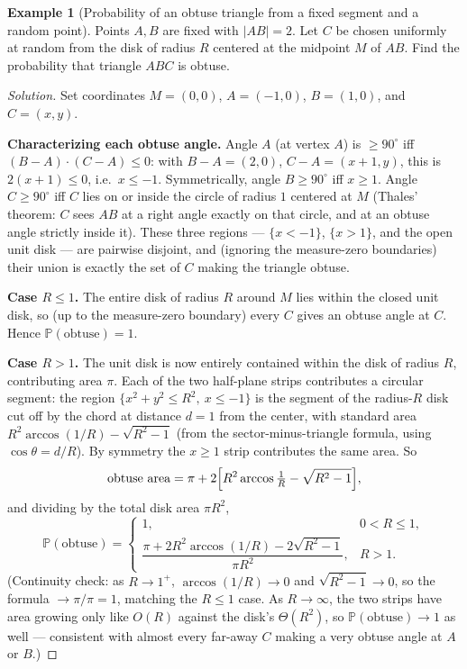 \documentclass[11pt]{article}
\theoremstyle{definition}
\newtheorem{example}{Example}[section]
\begin{document}
\begin{example}[Probability of an obtuse triangle from a fixed segment and a random point]
Points $A,B$ are fixed with $|AB|=2$. Let $C$ be chosen uniformly at random from the disk of radius $R$ centered at the midpoint $M$ of $AB$. Find the probability that triangle $ABC$ is obtuse.
\end{example}
\begin{proof}[Solution]
Set coordinates $M=(0,0)$, $A=(-1,0)$, $B=(1,0)$, and $C=(x,y)$.

\textbf{Characterizing each obtuse angle.} Angle $A$ (at vertex $A$) is $\ge90^\circ$ iff $(B-A)\cdot(C-A)\le0$: with $B-A=(2,0)$, $C-A=(x+1,y)$, this is $2(x+1)\le0$, i.e.\ $x\le-1$. Symmetrically, angle $B\ge90^\circ$ iff $x\ge1$. Angle $C\ge90^\circ$ iff $C$ lies on or inside the circle of radius $1$ centered at $M$ (Thales' theorem: $C$ sees $AB$ at a right angle exactly on that circle, and at an obtuse angle strictly inside it). These three regions — $\{x<-1\}$, $\{x>1\}$, and the open unit disk — are pairwise disjoint, and (ignoring the measure-zero boundaries) their union is exactly the set of $C$ making the triangle obtuse.

\textbf{Case $R\le1$.} The entire disk of radius $R$ around $M$ lies within the closed unit disk, so (up to the measure-zero boundary) every $C$ gives an obtuse angle at $C$. Hence $\mathbb P(\text{obtuse})=1$.

\textbf{Case $R>1$.} The unit disk is now entirely contained within the disk of radius $R$, contributing area $\pi$. Each of the two half-plane strips contributes a circular segment: the region $\{x^2+y^2\le R^2,\ x\le-1\}$ is the segment of the radius-$R$ disk cut off by the chord at distance $d=1$ from the center, with standard area $R^2\arccos(1/R)-\sqrt{R^2-1}$ (from the sector-minus-triangle formula, using $\cos\theta=d/R$). By symmetry the $x\ge1$ strip contributes the same area. So
\[
\text{obtuse area}=\pi+2\Bigl[R^2\arccos\tfrac1R-\sqrt{R^2-1}\Bigr],
\]
and dividing by the total disk area $\pi R^2$,
\[
\boxed{\mathbb P(\text{obtuse})=\begin{cases}1, & 0<R\le1,\\[4pt] \dfrac{\pi+2R^2\arccos(1/R)-2\sqrt{R^2-1}}{\pi R^2}, & R>1.\end{cases}}
\]
(Continuity check: as $R\to1^+$, $\arccos(1/R)\to0$ and $\sqrt{R^2-1}\to0$, so the formula $\to\pi/\pi=1$, matching the $R\le1$ case. As $R\to\infty$, the two strips have area growing only like $O(R)$ against the disk's $\Theta(R^2)$, so $\mathbb P(\text{obtuse})\to1$ as well — consistent with almost every far-away $C$ making a very obtuse angle at $A$ or $B$.)
\end{proof}
\end{document}
